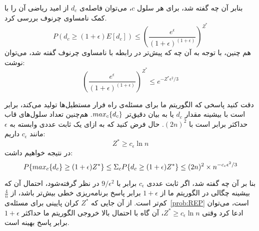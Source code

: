 
بنابر آن چه گفته شد، برای هر سلول $c$، می‌توان فاصله‌ی $d_c$ از امید ریاضی آن را با کمک نامساوی چرنوف بررسی کرد.
$$P(d_c \geq (1+\epsilon) E[d_c]) \leq (\frac{e^{\epsilon}}{(1+\epsilon)^{(1+\epsilon)}})^{Z^{*}}$$ 
هم چنین، با توجه به آن چه که پیش‌تر در رابطه با نامساوی چرنوف گفته شد، می‌توان نوشت:
$$(\frac{e^{\epsilon}}{(1+\epsilon)^{(1+\epsilon)}})^{Z^{*}} \leq e^{-{Z^{*}}\epsilon^2/3}$$

دقت کنید پاسخی که الگوریتم ما برای مسئله‌ی راه فرار مستطیل‌ها تولید می‌کند، برابر است با بیشینه مقدار $d_c$ یا به بیان دقیق‌تر $max_c{\{ d_c \}}$. هم‌چنین تعداد سلول‌های قاب حد‌اکثر برابر است با $(2n)^{2}$. حال فرض کنید که به ازای یک ثابت عددی وابسته به $\epsilon$ مانند $c_{\epsilon}$ داریم:
$$Z^{*} \geq c_{\epsilon}  \ln n$$ 
در نتیجه خواهیم داشت: 
$$P\{max_c {\{ d_c \}} \geq (1+\epsilon){Z^{*}} \} \leq \Sigma_{c} P\{d_c \geq (1+\epsilon) {Z^{*}}\} \leq (2n)^{2} \times n^{-c_{\epsilon}\epsilon^{2}/3}$$

بنا بر آن چه گفته شد، اگر ثابت عددی $c_{\epsilon}$ برابر با $9/{\epsilon}^2$ در نظر گرفته‌شود، احتمال آن که بیشینه چگالی در الگوریتم ما از $1+\epsilon$ برابر پاسخ برنامه‌ریزی خطی بیش‌تر باشد، از  $\frac{4}{n}$کم‌تر است. از آن جایی که $Z^{*}$ کران پایینی برای مسئله‌ی~\ref{prob:REP} است، می‌توان ادعا کرد وقتی $Z^{*} \geq c_{\epsilon}  \ln n$، آن گاه با احتمال بالا خروجی الگوریتم ما حداکثر $1+\epsilon$ برابر پاسخ بهینه است.
 


